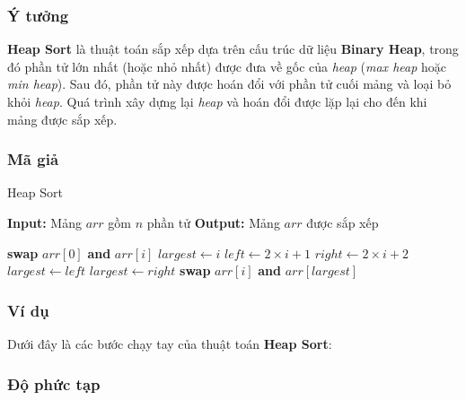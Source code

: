 \subsubsection{Ý tưởng}
\textbf{Heap Sort} là thuật toán sắp xếp dựa trên cấu trúc dữ liệu \textbf{Binary Heap}, trong đó phần tử lớn nhất (hoặc nhỏ nhất) được đưa về gốc của \textit{heap} (\textit{max heap} hoặc \textit{min heap}). Sau đó, phần tử này được hoán đổi với phần tử cuối mảng và loại bỏ khỏi \textit{heap}. Quá trình xây dựng lại \textit{heap} và hoán đổi được lặp lại cho đến khi mảng được sắp xếp.

\subsubsection{Mã giả}
\begin{algorithm}[H]
\caption{Heap Sort}
\begin{algorithmic}[1]
    \State \textbf{Input:} Mảng $arr$ gồm $n$ phần tử
    \State \textbf{Output:} Mảng $arr$ được sắp xếp
    
        \State {}
    \EndFor
    
        \State \textbf{swap} $arr[0]$ \textbf{and} $arr[i]$
        \State {}
    \EndFor
\EndProcedure
{}
    \State $largest \gets i$
    \State $left \gets 2\times i + 1$
    \State $right \gets 2\times i + 2$
        \State $largest \gets left$
    \EndIf
        \State $largest \gets right$
    \EndIf
        \State \textbf{swap} $arr[i]$ \textbf{and} $arr[largest]$
        \State {}
    \EndIf
\EndProcedure
\end{algorithmic}
\end{algorithm}

\subsubsection{Ví dụ}
Dưới đây là các bước chạy tay của thuật toán \textbf{Heap Sort}:

\subsubsection{Độ phức tạp}